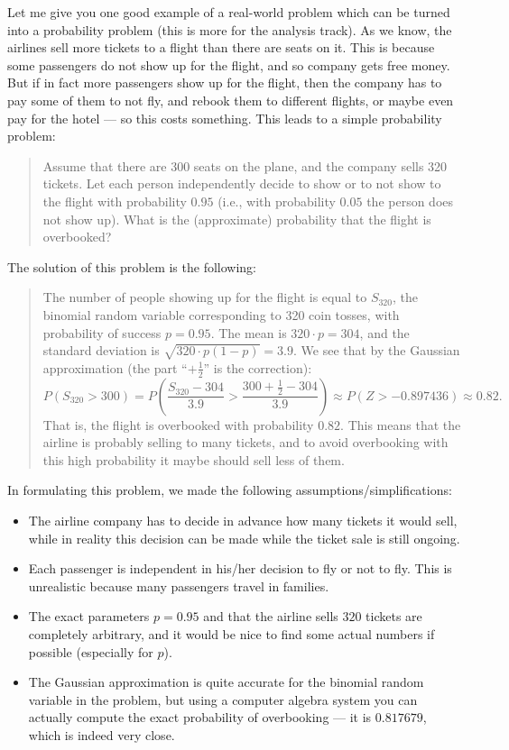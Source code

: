 \documentclass[oneside,11pt]{amsart}
\begin{document}
Let me give you one good example of a real-world problem which can be turned into a 
probability problem (this is more for the analysis track). 
As we know, the airlines sell more tickets to a flight than there are 
seats on it. This is because some passengers do not show up for the flight,
and so company gets free money. But if in fact more passengers show up for the flight, 
then the company has to pay some of them to not fly, and rebook them to different flights,
or maybe even pay for the hotel --- so this costs something.
This leads to a simple probability problem:
\begin{quote}
	Assume that there are 300 seats on the plane,
	and the company sells 320 tickets. Let each person
	independently decide to show or to not show to the flight
	with probability $0.95$ (i.e., with probability $0.05$ the person does not show up).
	What is the (approximate) probability that the flight is overbooked?
\end{quote}
The solution of this problem is the following:
\begin{quote}
	The number of people
	showing up for the flight is equal to $S_{320}$, the binomial
	random variable corresponding to 320 coin tosses, with probability
	of success $p=0.95$. The mean is $320\cdot p=304$, and the standard deviation
	is $\sqrt{320\cdot p(1-p)}=3.9$.
	We see that by the Gaussian approximation (the part ``$+\frac12$'' is the correction):
	\begin{equation*}
		P(S_{320}>300)=P\left(\frac{S_{320}-304}{3.9}>\frac{300+\frac12-304}{3.9}\right)\approx
		P(Z>-0.897436)\approx 0.82.
	\end{equation*}
	That is, the flight is overbooked with probability $0.82$.
	This means that the airline is probably selling to many 
	tickets, and to avoid overbooking with this high probability it maybe should 
	sell less of them.
\end{quote}
In formulating this problem, we made the following assumptions/simplifications:
\begin{itemize}
	\item The airline company has to decide in advance 
	how many tickets it would sell, while in reality this decision can be made
	while the ticket sale is still ongoing.
	\item Each passenger is independent in his/her decision to fly or not to fly. 
	This is unrealistic because many passengers travel in families.
	\item The exact parameters $p=0.95$ and that the airline sells $320$
	tickets are completely arbitrary, and it would be nice to find some actual numbers
	if possible (especially for $p$).
	\item The Gaussian approximation is quite accurate for the binomial
	random variable in the problem, but using a computer algebra system
	you can actually compute the exact probability
	of overbooking --- it is $0.817679$, which is indeed very close.
\end{itemize}
\end{document}
